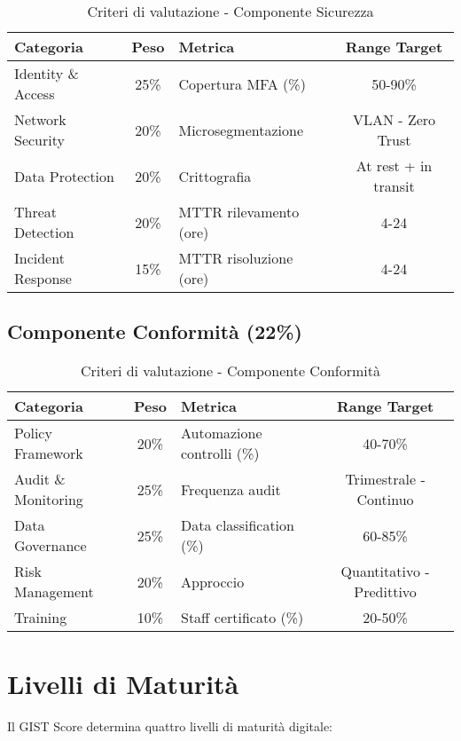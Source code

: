 \begin{table}[H]
\centering
\caption{Criteri di valutazione - Componente Sicurezza}
\small
\begin{tabular}{l c l c}
\toprule
\textbf{Categoria} & \textbf{Peso} & \textbf{Metrica} & \textbf{Range Target} \\
\midrule
Identity \& Access & 25\% & Copertura MFA (\%) & 50-90\% \\
Network Security & 20\% & Microsegmentazione & VLAN - Zero Trust \\
Data Protection & 20\% & Crittografia & At rest + in transit \\
Threat Detection & 20\% & MTTR rilevamento (ore) & 4-24 \\
Incident Response & 15\% & MTTR risoluzione (ore) & 4-24 \\
\bottomrule
\end{tabular}
\end{table}

\subsection{\texorpdfstring{Componente Conformità (22\%)}{B.3.4 - Componente Conformità (22\%)}}

\begin{table}[H]
\centering
\caption{Criteri di valutazione - Componente Conformità}
\small
\begin{tabular}{l c l c}
\toprule
\textbf{Categoria} & \textbf{Peso} & \textbf{Metrica} & \textbf{Range Target} \\
\midrule
Policy Framework & 20\% & Automazione controlli (\%) & 40-70\% \\
Audit \& Monitoring & 25\% & Frequenza audit & Trimestrale - Continuo \\
Data Governance & 25\% & Data classification (\%) & 60-85\% \\
Risk Management & 20\% & Approccio & Quantitativo - Predittivo \\
Training & 10\% & Staff certificato (\%) & 20-50\% \\
\bottomrule
\end{tabular}
\end{table}

\section{\texorpdfstring{Livelli di Maturità}{B.4 - Livelli di Maturità}}

Il GIST Score determina quattro livelli di maturità digitale:

